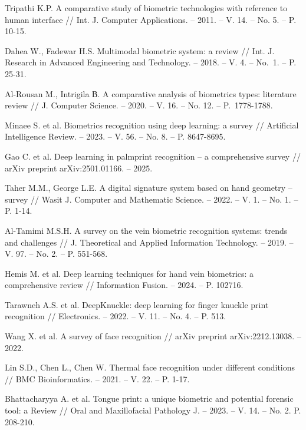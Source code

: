 \documentclass[12pt]{book}
\begin{document}
{{\begin{thebibliography}{11}
     Tripathi K.P. A comparative study of biometric technologies with reference to human interface // Int. J. Computer Applications. -- 2011. -- V. 14. -- No. 5. -- P. 10-15.

     Dahea W., Fadewar H.S. Multimodal biometric system: a review // Int. J. Research in Advanced Engineering and Technology. -- 2018. -- V. 4. -- No.~1. -- P. 25-31.

     Al-Rousan M., Intrigila В. A comparative analysis of biometrics types: literature review // J. Computer Science. -- 2020. -- V. 16. -- No. 12. -- P.~1778-1788. 

     Minaee S. et al. Biometrics recognition using deep learning: a survey // Artificial Intelligence Review. -- 2023. -- V. 56. -- No. 8. -- P. 8647-8695.

     Gao C. et al. Deep learning in palmprint recognition -- a comprehensive survey // arXiv preprint arXiv:2501.01166. -- 2025.

     Taher M.M., George L.E. A digital signature system based on hand geometry -- survey // Wasit J. Computer and Mathematic Science. -- 2022. -- V. 1. -- No. 1. -- P. 1-14.

     Al-Tamimi M.S.H. A survey on the vein biometric recognition systems: trends and challenges // J. Theoretical and Applied Information Technology. -- 2019. -- V. 97. -- No. 2. -- P. 551-568.

     Hemis M. et al. Deep learning techniques for hand vein biometrics: a comprehensive review // Information Fusion. -- 2024. -- P. 102716.

     Tarawneh A.S. et al. DeepKnuckle: deep learning for finger knuckle print recognition // Electronics. -- 2022. -- V. 11. -- No. 4. -- P. 513.

     Wang X. et al. A survey of face recognition // arXiv preprint arXiv:2212.13038. -- 2022.

     Lin S.D., Chen L., Chen W. Thermal face recognition under different conditions // BMC Bioinformatics. -- 2021. -- V. 22. -- P. 1-17.

     Bhattacharyya A. et al. Tongue print: a unique biometric and potential forensic tool: a Review // Oral and Maxillofacial Pathology J. -- 2023. -- V. 14. -- No. 2. P. 208-210.


\end{thebibliography}}}
\end{document}
